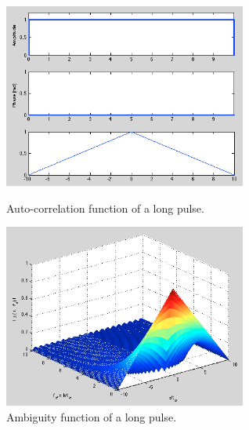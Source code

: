 \documentclass{article}
\begin{document}
\begin{figure}[htb]
\begin{minipage}[t]{0.5\linewidth}
\centering
\includegraphics[width=8cm]{Figures/long_pulse_data.png}
\caption{Auto-correlation function of a long pulse.}
\label{fig:long_pulse_data}
\end{minipage}
\begin{minipage}[t]{0.5\linewidth}
\centering
\includegraphics[width=8cm]{Figures/long_pulse_3d.png}
\caption{Ambiguity function of a long pulse.}
\label{fig:long_pulse_3d}
\end{minipage}
\end{figure}
\end{document}
